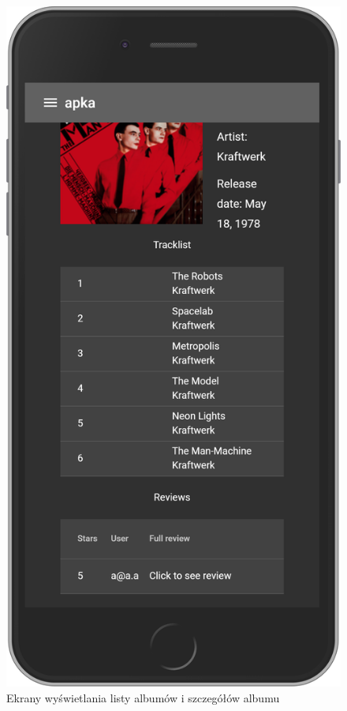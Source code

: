 \begin{figure}[H]
		\begin{minipage}{0.5\textwidth}
			\includegraphics[width=0.9\linewidth]{rys06/album.png}
		\end{minipage}
		\caption{Ekrany wyświetlania listy albumów i szczegółów albumu}
		\label{fig:album}
	\end{figure}
	
